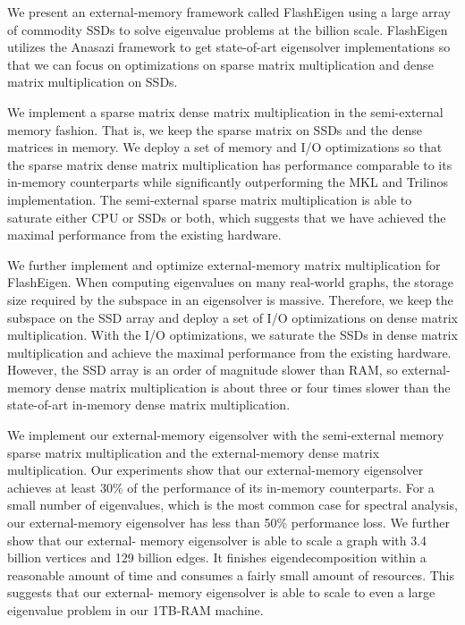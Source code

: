 We present an external-memory framework called FlashEigen using a large array
of commodity SSDs to solve eigenvalue problems at the billion scale. FlashEigen
utilizes the Anasazi framework to get state-of-art eigensolver implementations
so that we can focus on optimizations on sparse matrix multiplication and dense
matrix multiplication on SSDs.

We implement a sparse matrix dense matrix multiplication in the semi-external
memory fashion. That is, we keep the sparse matrix on SSDs and the dense matrices
in memory. We deploy a set of memory and I/O optimizations so that the sparse
matrix dense matrix multiplication has performance comparable to its in-memory
counterparts while significantly outperforming the MKL and Trilinos implementation.
The semi-external sparse matrix multiplication is able to saturate either CPU or
SSDs or both, which suggests that we have achieved the maximal performance from
the existing hardware.

We further implement and optimize external-memory matrix multiplication for
FlashEigen. When computing eigenvalues on many real-world graphs, the storage
size required by the subspace in an eigensolver is massive. Therefore, we keep
the subspace on the SSD array and deploy a set of I/O optimizations on dense
matrix multiplication. With the I/O optimizations, we saturate the SSDs in
dense matrix multiplication and achieve the maximal performance from the existing
hardware. However, the SSD array is an order of magnitude slower than RAM, so
external-memory dense matrix multiplication is about three or four times slower
than the state-of-art in-memory dense matrix multiplication.

We implement our external-memory eigensolver with the semi-external memory
sparse matrix multiplication and the external-memory dense matrix multiplication.
Our experiments show that our external-memory eigensolver achieves at least
30\% of the performance of its in-memory counterparts. For a small number of
eigenvalues, which is the most common case for spectral analysis, our external-memory
eigensolver has less than 50\% performance loss. We further show that our external-
memory eigensolver is able to scale a graph with 3.4 billion vertices and 129
billion edges. It finishes eigendecomposition within a reasonable amount of time
and consumes a fairly small amount of resources. This suggests that our external-
memory eigensolver is able to scale to even a large eigenvalue problem in our
1TB-RAM machine.

